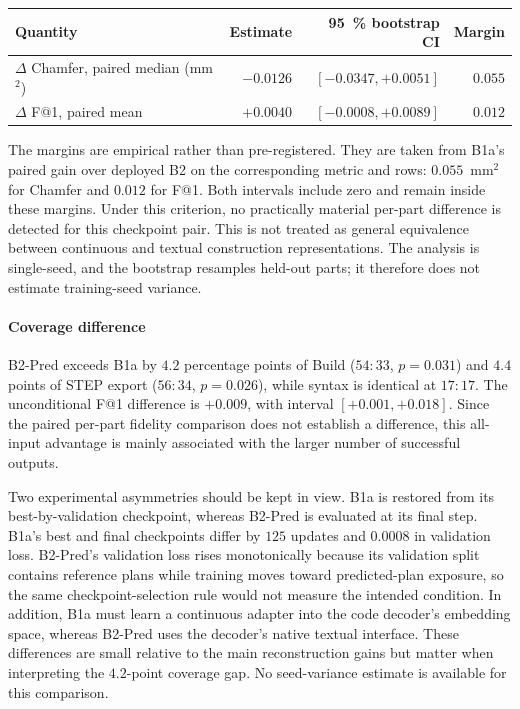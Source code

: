 \documentclass[preprint,12pt]{elsarticle}
\begin{document}
\begin{center}
  \footnotesize
  \begin{tabular}{lrrr}
    \toprule
    Quantity
     & Estimate
     & 95~\% bootstrap CI
     & Margin              \\
    \midrule
    $\Delta$ Chamfer, paired median (mm$^2$)
     & $-0.0126$
     & $[-0.0347,+0.0051]$
     & $0.055$             \\
    $\Delta$ F@1, paired mean
     & $+0.0040$
     & $[-0.0008,+0.0089]$
     & $0.012$             \\
    \bottomrule
  \end{tabular}
\end{center}

The margins are empirical rather than pre-registered. They are taken from B1a's paired gain
over deployed B2 on the corresponding metric and rows: $0.055$~mm$^2$ for Chamfer and
$0.012$ for F@1. Both intervals include zero and remain inside these margins. Under this
criterion, no practically material per-part difference is detected for this checkpoint pair.
This is not treated as general equivalence between continuous and textual construction
representations. The analysis is single-seed, and the bootstrap resamples held-out parts;
it therefore does not estimate training-seed variance.

\paragraph{Coverage difference}
B2-Pred exceeds B1a by $4.2$ percentage points of Build ($54:33$, $p = 0.031$) and
$4.4$ points of STEP export ($56:34$, $p = 0.026$), while syntax is identical at $17:17$.
The unconditional F@1 difference is $+0.009$, with interval $[+0.001,+0.018]$. Since the
paired per-part fidelity comparison does not establish a difference, this all-input advantage
is mainly associated with the larger number of successful outputs.

Two experimental asymmetries should be kept in view. B1a is restored from its
best-by-validation checkpoint, whereas B2-Pred is evaluated at its final step. B1a's best
and final checkpoints differ by $125$ updates and $0.0008$ in validation loss. B2-Pred's
validation loss rises monotonically because its validation split contains reference plans while
training moves toward predicted-plan exposure, so the same checkpoint-selection rule would not
measure the intended condition. In addition, B1a must learn a continuous adapter into the code
decoder's embedding space, whereas B2-Pred uses the decoder's native textual interface. These
differences are small relative to the main reconstruction gains but matter when interpreting the
$4.2$-point coverage gap. No seed-variance estimate is available for this comparison.
\end{document}
